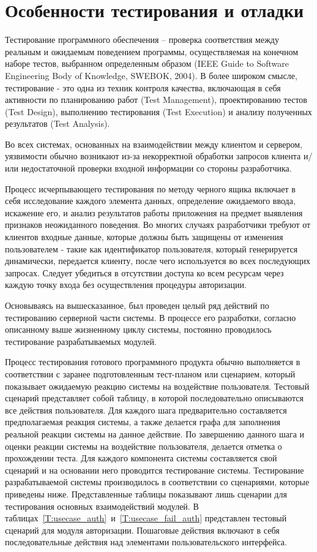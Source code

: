 \documentclass[utf8,usehyperref,12pt]{G7-32}
\begin{document}
\section{Особенности тестирования и отладки}

Тестирование программного обеспечения – проверка соответствия между реальным и ожидаемым поведением программы, осуществляемая на конечном наборе тестов, выбранном определенным образом (IEEE Guide to Software Engineering Body of Knowledge, SWEBOK, 2004). В более широком смысле, тестирование - это одна из техник контроля качества, включающая в  себя активности по планированию работ (Test Management), проектированию тестов (Test Design), выполнению тестирования (Test Execution) и анализу полученных результатов (Test Analysis).

Во всех системах, основанных на взаимодействии между клиентом и сервером, уязвимости обычно возникают из-за некорректной обработки запросов клиента и/или недостаточной проверки входной информации со стороны разработчика. 

Процесс исчерпывающего тестирования по методу черного ящика включает в себя исследование каждого элемента данных, определение ожидаемого ввода, искажение его, и анализ результатов работы приложения на предмет выявления признаков неожиданного поведения. Во многих случаях разработчики требуют от клиентов входные данные, которые должны быть защищены от изменения пользователем - такие как идентификатор пользователя, который генерируется динамически, передается клиенту, после чего используется во всех последующих запросах. Следует убедиться в отсутствии доступа ко всем ресурсам через каждую точку входа без осуществления процедуры авторизации.

Основываясь на вышесказанное, был проведен целый ряд действий по тестированию серверной части системы. В процессе его разработки, согласно описанному выше жизненному циклу системы, постоянно проводилось тестирование разрабатываемых модулей. 

Процесс тестирования готового программного продукта обычно выполняется в соответствии с заранее подготовленным тест-планом или сценарием, который показывает ожидаемую реакцию системы на воздействие пользователя. Тестовый сценарий представляет собой таблицу, в которой последовательно описываются все действия пользователя. Для каждого шага предварительно составляется предполагаемая реакция системы, а также делается графа для заполнения реальной реакции системы на данное действие. По завершению данного шага и оценки реакции системы на воздействие пользователя, делается отметка о прохождении теста. Для каждого компонента системы составляется свой сценарий и на основании него проводится тестирование системы. Тестирование разрабатываемой системы производилось в  соответствии со сценариями, которые приведены ниже. Представленные таблицы показывают лишь сценарии для тестирования основных взаимодействий модулей. В таблицах~\ref{T:usecase_auth}~и~\ref{T:usecase_fail_auth} представлен тестовый сценарий для модуля авторизации. Пошаговые действия включают в себя последовательные действия над элементами пользовательского интерфейса.    
\end{document}
